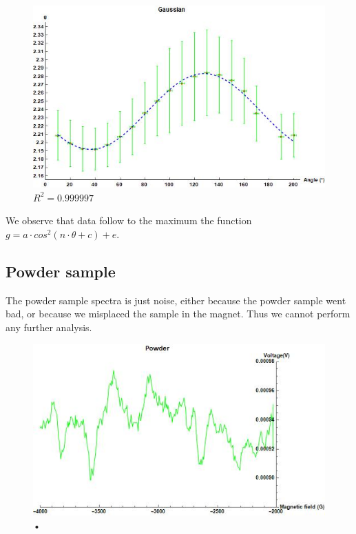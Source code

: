 \documentclass[openany,11pt,a4paper]{report}
\begin{document}
\begin{figure}[H]
\centering
\includegraphics[scale=0.8]{gga2.jpg}
\caption{$R^{2}=0.999997$}
\end{figure}


We observe that data follow to the maximum the function $g= a\cdot cos^{2}(n\cdot \theta + c) + e$.



\subsection{Powder sample}
The powder sample spectra is just noise, either because the powder sample went bad, or because we misplaced the sample in the magnet. Thus we cannot perform any further analysis.



\begin{figure}[hbtp]
\centering
\includegraphics[scale=0.8]{powder.jpg}
\caption{•}
\end{figure}
\end{document}
